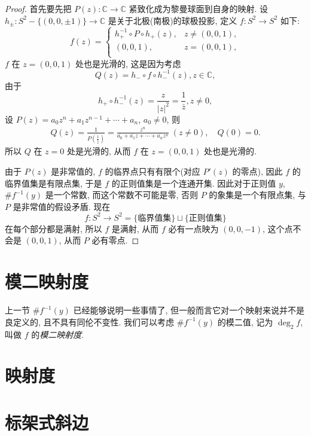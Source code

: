 \documentclass[12pt,a4paper]{article}
\begin{document}
\begin{proof}
    首先要先把 $P(z): \mathbb{C} \to \mathbb{C}$ 紧致化成为黎曼球面到自身的映射. 
    设 $h_{\pm}:S^2-\{(0,0,\pm 1)\}\to\mathbb{C}$ 是关于北极(南极)的球极投影, 
    定义 $f: S^2\to S^2$ 如下:
    \begin{equation*}
        f(z) = 
        \begin{cases}
            h_+^{-1}\circ P\circ h_+(z), & z\neq (0,0,1),\\
            (0,0,1), & z = (0,0,1),\\
        \end{cases}
    \end{equation*} 
    $f$ 在 $z=(0,0,1)$ 处也是光滑的, 这是因为考虑 
    \begin{equation*}
        Q(z) = h_-\circ f\circ h_-^{-1}(z), z\in\mathbb{C},
    \end{equation*}
    由于
    \begin{equation*}
        h_+\circ h_-^{-1}(z) = \frac{z}{|z|^2} = \frac{1}{\bar{z}}, z\neq 0,
    \end{equation*}
    设 $P(z) = a_0z^n + a_1z^{n-1} + \cdots + a_n$, $a_0 \neq 0$, 则
    \begin{gather*}
        Q(z) = \frac{1}{\overline{P(\frac{1}{\bar{z}})}} 
        = \frac{z^n}{\overline{a_0}+\overline{a_1}z+\cdots+\overline{a_n}z^n}\; (z\neq 0), 
        \quad Q(0) = 0.
    \end{gather*}
    所以 $Q$ 在 $z=0$ 处是光滑的, 从而 $f$ 在 $z=(0,0,1)$ 处也是光滑的.

    由于 $P(z)$ 是非常值的, $f$ 的临界点只有有限个(对应 $P'(z)$ 的零点), 
    因此 $f$ 的临界值集是有限点集, 于是 $f$ 的正则值集是一个连通开集. 
    因此对于正则值 $y$, $\#f^{-1}(y)$ 是一个常数, 而这个常数不可能是零, 
    否则 $P$ 的象集是一个有限点集, 与 $P$ 是非常值的假设矛盾. 现在 
    \begin{equation*}
        f:S^2\to S^2 = \{\text{临界值集}\}\sqcup \{\text{正则值集}\}
    \end{equation*}
    在每个部分都是满射, 所以 $f$ 是满射, 从而 $f$ 必有一点映为 $(0,0,-1)$, 
    这个点不会是 $(0,0,1)$, 从而 $P$ 必有零点.
\end{proof}

\section{模二映射度}
上一节 $\#f^{-1}(y)$ 已经能够说明一些事情了, 
但一般而言它对一个映射来说并不是良定义的, 且不具有同伦不变性. 
我们可以考虑 $\#f^{-1}(y)$ 的模二值, 记为 $\deg_2 f$, 
叫做 $f$ 的\emph{模二映射度}.

\section{映射度}
\section{标架式斜边}
\end{document}
